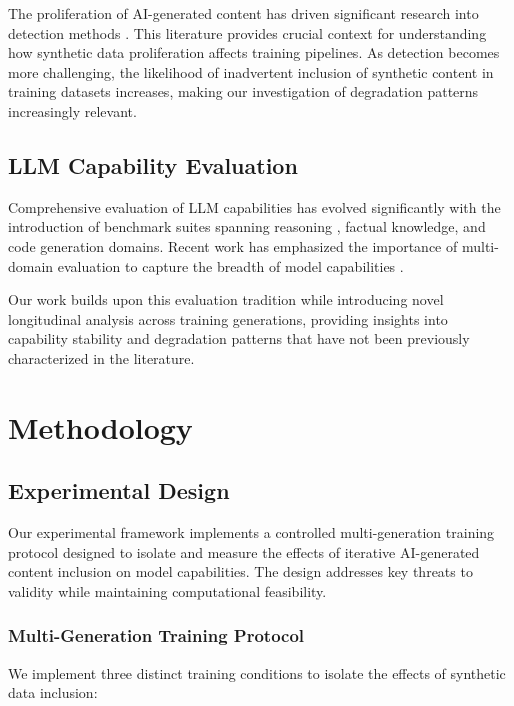\documentclass{article}
\begin{document}
The proliferation of AI-generated content has driven significant research into detection methods \citep{borji2022pros}. This literature provides crucial context for understanding how synthetic data proliferation affects training pipelines. As detection becomes more challenging, the likelihood of inadvertent inclusion of synthetic content in training datasets increases, making our investigation of degradation patterns increasingly relevant.

\subsection{LLM Capability Evaluation}

Comprehensive evaluation of LLM capabilities has evolved significantly with the introduction of benchmark suites spanning reasoning \citep{brown2020language}, factual knowledge, and code generation domains. Recent work has emphasized the importance of multi-domain evaluation to capture the breadth of model capabilities \citep{ouyang2022training,chowdhery2022palm}.

Our work builds upon this evaluation tradition while introducing novel longitudinal analysis across training generations, providing insights into capability stability and degradation patterns that have not been previously characterized in the literature.

\section{Methodology}

\subsection{Experimental Design}

Our experimental framework implements a controlled multi-generation training protocol designed to isolate and measure the effects of iterative AI-generated content inclusion on model capabilities. The design addresses key threats to validity while maintaining computational feasibility.

\subsubsection{Multi-Generation Training Protocol}

We implement three distinct training conditions to isolate the effects of synthetic data inclusion:
\end{document}
